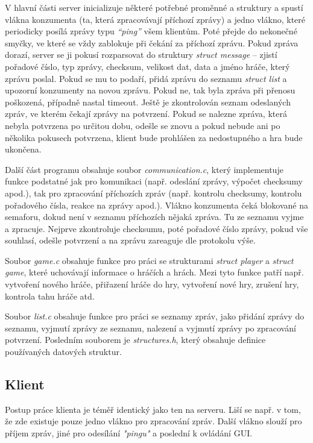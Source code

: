 \documentclass[12pt, a4paper]{article}
\begin{document}
		V hlavní části server inicializuje některé potřebné proměnné a struktury a spustí vlákna konzumenta (ta, která zpracovávají příchozí zprávy) a jedno vlákno, které periodicky posílá zprávy typu \emph{“ping”} všem klientům. Poté přejde do nekonečné smyčky, ve které se vždy zablokuje při čekání za příchozí zprávu. Pokud zpráva dorazí, server se ji pokusí rozparsovat do struktury \emph{struct message} -- zjistí pořadové číslo, typ zprávy, checksum, velikost dat, data a jméno hráče, který zprávu poslal. Pokud se mu to podaří, přidá zprávu do seznamu \emph{struct list} a upozorní konzumenty na novou zprávu. Pokud ne, tak byla zpráva při přenosu poškozená, případně nastal timeout. Ještě je zkontrolován seznam odeslaných zpráv, ve kterém čekají zprávy na potvrzení. Pokud se nalezne zpráva, která nebyla potvrzena po určitou dobu, odešle se znovu a pokud nebude ani po několika pokusech potvrzena, klient bude prohlášen za nedostupného a hra bude ukončena.
		
		Další část programu obsahuje soubor \emph{communication.c}, který implementuje funkce podstatné jak pro komunikaci (např. odeslání zprávy, výpočet checksumy apod.), tak pro zpracování příchozích zpráv (např. kontrolu checksumy, kontrolu pořadového čísla, reakce na zprávy apod.). Vlákno konzumenta čeká blokované na semaforu, dokud není v seznamu příchozích nějaká zpráva. Tu ze seznamu vyjme a zpracuje. Nejprve zkontroluje checksumu, poté pořadové číslo zprávy, pokud vše souhlasí, odešle potvrzení a na zprávu zareaguje dle protokolu výše.
		
		Soubor \emph{game.c} obsahuje funkce pro práci se strukturami \emph{struct player} a \emph{struct game}, které uchovávají informace o hráčích a hrách. Mezi tyto funkce patří např. vytvoření nového hráče, přiřazení hráče do hry, vytvoření nové hry, zrušení hry, kontrola tahu hráče atd.
		
		Soubor \emph{list.c} obsahuje funkce pro práci se seznamy zpráv, jako přidání zprávy do seznamu, vyjmutí zprávy ze seznamu, nalezení a vyjmutí zprávy po zpracování potvrzení. Posledním souborem je \emph{structures.h}, který obsahuje definice používaných datových struktur.
		
		\subsection{Klient}
		Postup práce klienta je téměř identický jako ten na serveru. Liší se např. v tom, že zde existuje pouze jedno vlákno pro zpracování zpráv. Další vlákno slouží pro příjem zpráv, jiné pro odesílání \emph{"pingu"} a poslední k ovládání GUI.
		
\end{document}

